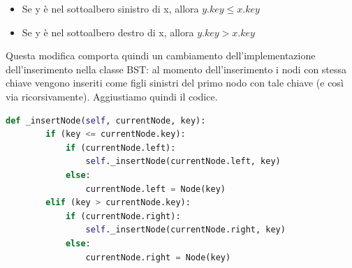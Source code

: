 \documentclass{article}
\begin{document}
\begin{center}
\begin{mybox}
	\begin{itemize}
    \item Se y è nel sottoalbero sinistro di x, allora \(y.key \le x.key\) 
     \item Se y è nel sottoalbero destro di x, allora \(y.key > x.key\) 
	\end{itemize}
\end{mybox}
\end{center}
\label{prop:bst-normal-implementation-prop}

Questa modifica comporta quindi un cambiamento dell'implementazione dell'inserimento nella classe BST: al momento dell'inserimento i nodi con stessa chiave vengono inseriti come figli sinistri del primo nodo con tale chiave (e così via ricorsivamente). Aggiustiamo quindi il codice.
\begin{lstlisting}[language=Python, caption={Funzione ausiliaria di inserimento aggiornata}, label=tree-plot]
    def _insertNode(self, currentNode, key):
        if (key <= currentNode.key):
            if (currentNode.left):
                self._insertNode(currentNode.left, key)
            else:
                currentNode.left = Node(key)
        elif (key > currentNode.key):
            if (currentNode.right):
                self._insertNode(currentNode.right, key)
            else:
                currentNode.right = Node(key)
\end{lstlisting}
\end{document}
